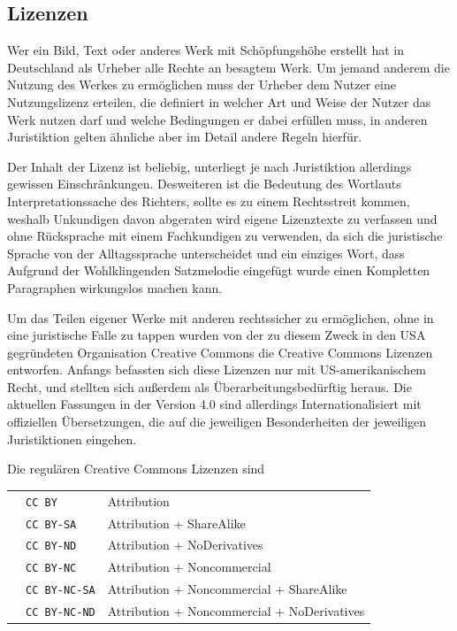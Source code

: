 \subsection{Lizenzen}

Wer ein Bild, Text oder anderes Werk mit Schöpfungshöhe erstellt hat in
Deutschland als Urheber alle Rechte an besagtem Werk. Um jemand anderem die
Nutzung des Werkes zu ermöglichen muss der Urheber dem Nutzer eine
Nutzungslizenz erteilen, die definiert in welcher Art und Weise der Nutzer das
Werk nutzen darf und welche Bedingungen er dabei erfüllen muss, in anderen
Juristiktion gelten ähnliche aber im Detail andere Regeln hierfür.

Der Inhalt der Lizenz ist beliebig, unterliegt je nach Juristiktion allerdings
gewissen Einschränkungen. Desweiteren ist die Bedeutung des Wortlauts
Interpretationssache des Richters, sollte es zu einem Rechtsstreit kommen,
weshalb Unkundigen davon abgeraten wird eigene Lizenztexte zu verfassen und ohne
Rücksprache mit einem Fachkundigen zu verwenden, da sich die juristische Sprache
von der Alltagssprache unterscheidet und ein einziges Wort, dass Aufgrund der
Wohlklingenden Satzmelodie eingefügt wurde einen Kompletten Paragraphen
wirkungslos machen kann.

Um das Teilen eigener Werke mit anderen rechtssicher zu ermöglichen, ohne in
eine juristische Falle zu tappen wurden von der zu diesem Zweck in den USA
gegründeten Organisation Creative Commons die Creative Commons Lizenzen
entworfen. Anfangs befassten sich diese Lizenzen nur mit US-amerikanischem
Recht, und stellten sich außerdem als Überarbeitungsbedürftig heraus. Die
aktuellen Fassungen in der Version 4.0 sind allerdings Internationalisiert mit
offiziellen Übersetzungen, die auf die jeweiligen Besonderheiten der jeweiligen
Juristiktionen eingehen.

Die regulären Creative Commons Lizenzen sind

\begin{tabular}{ c l l }
  & \texttt{CC BY} & Attribution \\
  & \texttt{CC BY-SA} & Attribution + ShareAlike \\
  & \texttt{CC BY-ND} & Attribution + NoDerivatives \\
  & \texttt{CC BY-NC} & Attribution + Noncommercial \\
  & \texttt{CC BY-NC-SA} & Attribution + Noncommercial + ShareAlike \\
  & \texttt{CC BY-NC-ND} &  Attribution + Noncommercial + NoDerivatives
\end{tabular}

